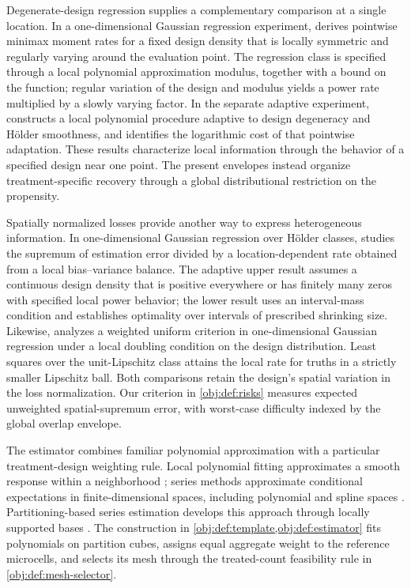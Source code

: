 Degenerate-design regression supplies a complementary comparison at a single location. In a one-dimensional Gaussian regression experiment, \citet[Assumption M and Theorem 1, pp. 3--4]{Gaiffas2005DegenerateRates} derives pointwise minimax moment rates for a fixed design density that is locally symmetric and regularly varying around the evaluation point. The regression class is specified through a local polynomial approximation modulus, together with a bound on the function; regular variation of the design and modulus yields a power rate multiplied by a slowly varying factor. In the separate adaptive experiment, \citet[Abstract]{Gaiffas2005AdaptiveDegenerateDesign} constructs a local polynomial procedure adaptive to design degeneracy and Hölder smoothness, and identifies the logarithmic cost of that pointwise adaptation. These results characterize local information through the behavior of a specified design near one point. The present envelopes instead organize treatment-specific recovery through a global distributional restriction on the propensity.

Spatially normalized losses provide another way to express heterogeneous information. In one-dimensional Gaussian regression over Hölder classes, \citet[Assumption D, equation (2.1), and Theorems 1--2]{gaiffas2009} studies the supremum of estimation error divided by a location-dependent rate obtained from a local bias--variance balance. The adaptive upper result assumes a continuous design density that is positive everywhere or has finitely many zeros with specified local power behavior; the lower result uses an interval-mass condition and establishes optimality over intervals of prescribed shrinking size. Likewise, \citet[Sections 1 and 3]{schmidthieber2024} analyzes a weighted uniform criterion in one-dimensional Gaussian regression under a local doubling condition on the design distribution. Least squares over the unit-Lipschitz class attains the local rate for truths in a strictly smaller Lipschitz ball. Both comparisons retain the design's spatial variation in the loss normalization. Our criterion in \cref{obj:def:risks} measures expected unweighted spatial-supremum error, with worst-case difficulty indexed by the global overlap envelope.

The estimator combines familiar polynomial approximation with a particular treatment-design weighting rule. Local polynomial fitting approximates a smooth response within a neighborhood \citep{fan1996}; series methods approximate conditional expectations in finite-dimensional spaces, including polynomial and spline spaces \citep{newey1997}. Partitioning-based series estimation develops this approach through locally supported bases \citep{CattaneoFarrellFeng2020}. The construction in \cref{obj:def:template,obj:def:estimator} fits polynomials on partition cubes, assigns equal aggregate weight to the reference microcells, and selects its mesh through the treated-count feasibility rule in \cref{obj:def:mesh-selector}.

